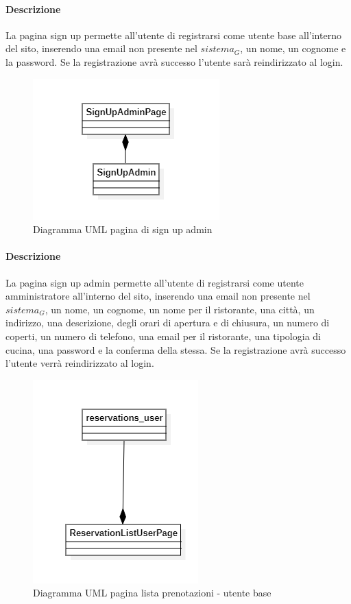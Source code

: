 \paragraph{Descrizione} La pagina sign up permette all'utente di registrarsi come utente base all'interno del sito, inserendo una email non presente nel $\textit{sistema}_G$, un nome, un cognome e la password. Se la registrazione avrà successo l'utente sarà reindirizzato al login.
\begin{figure}[H]
    \centering
    \includegraphics[width=0.45\linewidth]{images/SignUpAdmin.png}
    \caption{Diagramma UML pagina di sign up admin}
    \label{fig:UML-signupadmin}
\end{figure}
\paragraph{Descrizione} La pagina sign up admin permette all'utente di registrarsi come utente amministratore all'interno del sito, inserendo una email non presente nel $\textit{sistema}_G$, un nome, un cognome, un nome per il ristorante, una città, un indirizzo, una descrizione, degli orari di apertura e di chiusura, un numero di coperti, un numero di telefono, una email per il ristorante, una tipologia di cucina, una password e la conferma della stessa. Se la registrazione avrà successo l'utente verrà reindirizzato al login.


\begin{figure}[H]
    \centering
    \includegraphics[width=0.3\linewidth]{images/user_reservationS_page.png}
    \caption{Diagramma UML pagina lista prenotazioni - utente base}
    \label{fig:UML-user_reservationS_page}
\end{figure}
